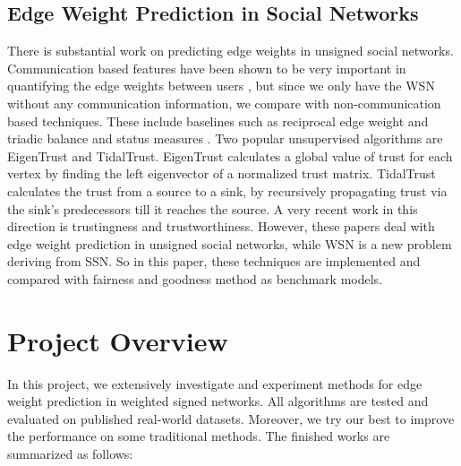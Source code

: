 \documentclass{article}
\begin{document}
\subsection{Edge Weight Prediction in Social Networks}
There is substantial work on predicting edge weights in unsigned social 
networks. Communication based features have been shown to be 
very important in quantifying the edge weights between 
users\cite{Gilbert:2012:PTS:2145204.2145360}\cite{Gilbert:2009:PTS:1518701.1518736}
\cite{Xiang:2010:MRS:1772690.1772790}\cite{Kahanda2009}, but 
since we only have the WSN without any communication information, 
we compare with non-communication based techniques. These 
include baselines such as reciprocal edge weight\cite{Gilbert:2012:PTS:2145204.2145360} 
and triadic balance and status measures\cite{Gilbert:2009:PTS:1518701.1518736}
\cite{Sintos:2014:UST:2623330.2623664}. Two popular unsupervised 
algorithms are EigenTrust\cite{Kamvar:2003:EAR:775152.775242} 
and TidalTrust\cite{Katz2006}. EigenTrust calculates a global 
value of trust for each vertex by finding the left eigenvector 
of a normalized trust matrix. TidalTrust calculates the trust 
from a source to a sink, by recursively propagating trust via 
the sink’s predecessors till it reaches the source. A very 
recent work in this direction is trustingness and 
trustworthiness\cite{Roy2016}. However, these papers deal with 
edge weight prediction in unsigned social networks, while WSN 
is a new problem deriving from SSN. So in this paper, these 
techniques are implemented and compared with fairness and goodness 
method as benchmark models.

\section{Project Overview}
In this project, we extensively investigate and experiment methods for edge weight prediction in weighted signed networks. All algorithms are tested and evaluated on published real-world datasets. Moreover, we try our best to improve the performance on some traditional methods. The finished works are summarized as follows:
\end{document}
